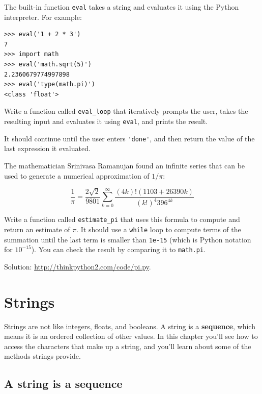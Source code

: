 \documentclass[10pt]{book}
\begin{document}
\begin{exercise}

The built-in function {\tt eval} takes a string and evaluates
it using the Python interpreter.  For example:

\begin{verbatim}
>>> eval('1 + 2 * 3')
7
>>> import math
>>> eval('math.sqrt(5)')
2.2360679774997898
>>> eval('type(math.pi)')
<class 'float'>
\end{verbatim}
%
Write a function called \verb"eval_loop" that iteratively
prompts the user, takes the resulting input and evaluates
it using {\tt eval}, and prints the result.

It should continue until the user enters \verb"'done'", and then
return the value of the last expression it evaluated.

\end{exercise}


\begin{exercise}

The mathematician Srinivasa Ramanujan found an
infinite series
that can be used to generate a numerical
approximation of $1 / \pi$:

\[ \frac{1}{\pi} = \frac{2\sqrt{2}}{9801} 
\sum^\infty_{k=0} \frac{(4k)!(1103+26390k)}{(k!)^4 396^{4k}} \]

Write a function called \verb"estimate_pi" that uses this formula
to compute and return an estimate of $\pi$.  It should use a {\tt while}
loop to compute terms of the summation until the last term is
smaller than {\tt 1e-15} (which is Python notation for $10^{-15}$).
You can check the result by comparing it to {\tt math.pi}.

Solution: \url{http://thinkpython2.com/code/pi.py}.

\end{exercise}


\chapter{Strings}
\label{strings}

Strings are not like integers, floats, and booleans.  A string
is a {\bf sequence}, which means it is
an ordered collection of other values.  In this chapter you'll see
how to access the characters that make up a string, and you'll
learn about some of the methods strings provide.


\section{A string is a sequence}
\end{document}
